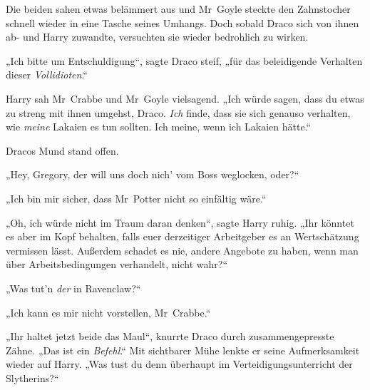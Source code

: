 Die beiden sahen etwas belämmert aus und Mr~Goyle steckte den Zahnstocher schnell wieder in eine Tasche seines Umhangs. Doch sobald Draco sich von ihnen ab- und Harry zuwandte, versuchten sie wieder bedrohlich zu wirken.

„Ich bitte um Entschuldigung“, sagte Draco steif, „für das beleidigende Verhalten dieser \emph{Vollidioten}.“

Harry sah Mr~Crabbe und Mr~Goyle vielsagend.
„Ich würde sagen, dass du etwas zu streng mit ihnen umgehst, Draco. \emph{Ich} finde, dass sie sich genauso verhalten, wie \emph{meine} Lakaien es tun sollten. Ich meine, wenn ich Lakaien hätte.“

Dracos Mund stand offen.

„Hey, Gregory, der will uns doch nich’ vom Boss weglocken, oder?“

„Ich bin mir sicher, dass Mr~Potter nicht so einfältig wäre.“

„Oh, ich würde nicht im Traum daran denken“, sagte Harry ruhig.
„Ihr könntet es aber im Kopf behalten, falls euer derzeitiger Arbeitgeber es an Wertschätzung vermissen lässt. Außerdem schadet es nie, andere Angebote zu haben, wenn man über Arbeitsbedingungen verhandelt, nicht wahr?“

„Was tut’n \emph{der} in Ravenclaw?“

„Ich kann es mir nicht vorstellen, Mr~Crabbe.“

„Ihr haltet jetzt beide das Maul“, knurrte Draco durch zusammengepresste Zähne.
„Das ist ein \emph{Befehl}.“ Mit sichtbarer Mühe lenkte er seine Aufmerksamkeit wieder auf Harry.
„Was tust du denn überhaupt im Verteidigungsunterricht der Slytherins?“

